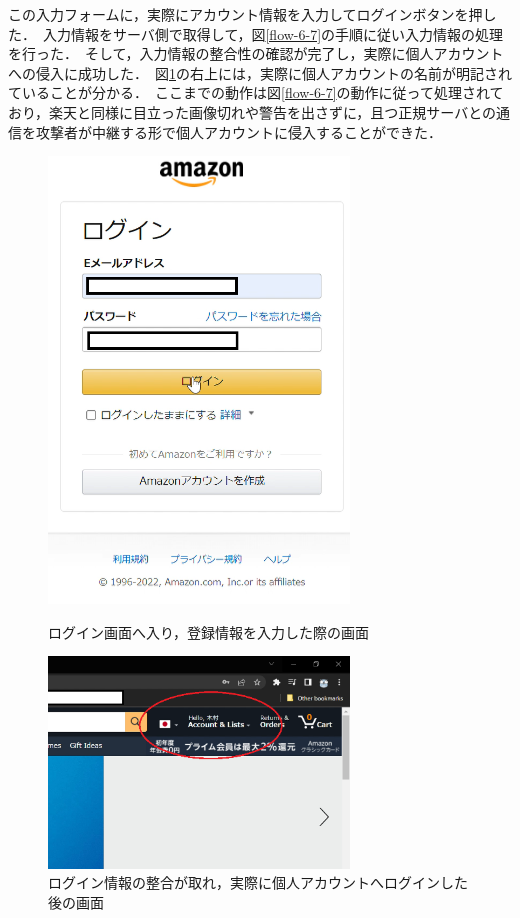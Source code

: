 \documentclass[dvipdfmx,twocolumn]{jsarticle}
\begin{document}
                この入力フォームに，実際にアカウント情報を入力してログインボタンを押した．\
                入力情報をサーバ側で取得して，図\ref{flow-6-7}の手順に従い入力情報の処理を行った．\
                そして，入力情報の整合性の確認が完了し，実際に個人アカウントへの侵入に成功した．\
                図\ref{amazon-03}の右上には，実際に個人アカウントの名前が明記されていることが分かる．\
                ここまでの動作は図\ref{flow-6-7}の動作に従って処理されており，楽天と同様に目立った画像切れや警告を出さずに，且つ正規サーバとの通信を攻撃者が中継する形で個人アカウントに侵入することができた．\
                \begin{figure}[h]
                    \centering
                    \includegraphics[width=8cm]{img/amazon/amazon-02.png}
                    \caption{ログイン画面へ入り，登録情報を入力した際の画面}
                    \label{amazon-02}
                    \includegraphics[width=8cm]{img/amazon/amazon-03.png}
                    \caption{ログイン情報の整合が取れ，実際に個人アカウントへログインした後の画面}
                    \label{amazon-03}
                \end{figure}
\end{document}
